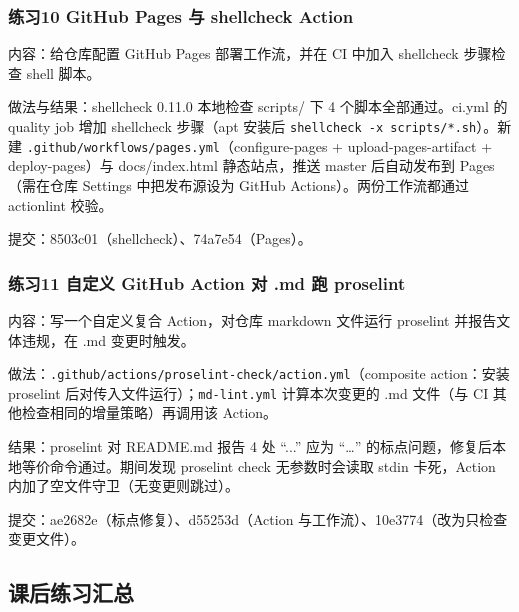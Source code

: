 \documentclass[UTF8]{ctexart}
\begin{document}
\subsubsection{练习10 GitHub Pages 与 shellcheck Action}

内容：给仓库配置 GitHub Pages 部署工作流，并在 CI 中加入 shellcheck 步骤检查 shell 脚本。

做法与结果：shellcheck 0.11.0 本地检查 scripts/ 下 4 个脚本全部通过。ci.yml 的 quality job 增加 shellcheck 步骤（apt 安装后 \texttt{shellcheck -x scripts/*.sh}）。新建 \texttt{.github/workflows/pages.yml}（configure-pages + upload-pages-artifact + deploy-pages）与 docs/index.html 静态站点，推送 master 后自动发布到 Pages（需在仓库 Settings 中把发布源设为 GitHub Actions）。两份工作流都通过 actionlint 校验。

提交：8503c01（shellcheck）、74a7e54（Pages）。

\subsubsection{练习11 自定义 GitHub Action 对 .md 跑 proselint}

内容：写一个自定义复合 Action，对仓库 markdown 文件运行 proselint 并报告文体违规，在 .md 变更时触发。

做法：\texttt{.github/actions/proselint-check/action.yml}（composite action：安装 proselint 后对传入文件运行）；\texttt{md-lint.yml} 计算本次变更的 .md 文件（与 CI 其他检查相同的增量策略）再调用该 Action。

结果：proselint 对 README.md 报告 4 处 ``...'' 应为 ``…'' 的标点问题，修复后本地等价命令通过。期间发现 proselint check 无参数时会读取 stdin 卡死，Action 内加了空文件守卫（无变更则跳过）。

提交：ae2682e（标点修复）、d55253d（Action 与工作流）、10e3774（改为只检查变更文件）。

\subsection{课后练习汇总}
\end{document}
